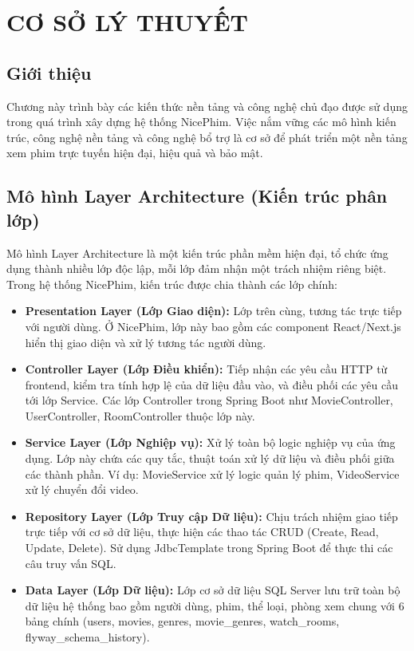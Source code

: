 \newpage

\section{CƠ SỞ LÝ THUYẾT}



\subsection{Giới thiệu}

Chương này trình bày các kiến thức nền tảng và công nghệ chủ đạo được sử dụng trong quá trình xây dựng hệ thống NicePhim. Việc nắm vững các mô hình kiến trúc, công nghệ nền tảng và công nghệ bổ trợ là cơ sở để phát triển một nền tảng xem phim trực tuyến hiện đại, hiệu quả và bảo mật.

\subsection{Mô hình Layer Architecture (Kiến trúc phân lớp)}

Mô hình Layer Architecture là một kiến trúc phần mềm hiện đại, tổ chức ứng dụng thành nhiều lớp độc lập, mỗi lớp đảm nhận một trách nhiệm riêng biệt. Trong hệ thống NicePhim, kiến trúc được chia thành các lớp chính:

\begin{itemize}
	\item \textbf{Presentation Layer (Lớp Giao diện):} Lớp trên cùng, tương tác trực tiếp với người dùng. Ở NicePhim, lớp này bao gồm các component React/Next.js hiển thị giao diện và xử lý tương tác người dùng.

	\item \textbf{Controller Layer (Lớp Điều khiển):} Tiếp nhận các yêu cầu HTTP từ frontend, kiểm tra tính hợp lệ của dữ liệu đầu vào, và điều phối các yêu cầu tới lớp Service. Các lớp Controller trong Spring Boot như MovieController, UserController, RoomController thuộc lớp này.

	\item \textbf{Service Layer (Lớp Nghiệp vụ):} Xử lý toàn bộ logic nghiệp vụ của ứng dụng. Lớp này chứa các quy tắc, thuật toán xử lý dữ liệu và điều phối giữa các thành phần. Ví dụ: MovieService xử lý logic quản lý phim, VideoService xử lý chuyển đổi video.

	\item \textbf{Repository Layer (Lớp Truy cập Dữ liệu):} Chịu trách nhiệm giao tiếp trực tiếp với cơ sở dữ liệu, thực hiện các thao tác CRUD (Create, Read, Update, Delete). Sử dụng JdbcTemplate trong Spring Boot để thực thi các câu truy vấn SQL.

	\item \textbf{Data Layer (Lớp Dữ liệu):} Lớp cơ sở dữ liệu SQL Server lưu trữ toàn bộ dữ liệu hệ thống bao gồm người dùng, phim, thể loại, phòng xem chung với 6 bảng chính (users, movies, genres, movie\_genres, watch\_rooms, flyway\_schema\_history).
\end{itemize}


